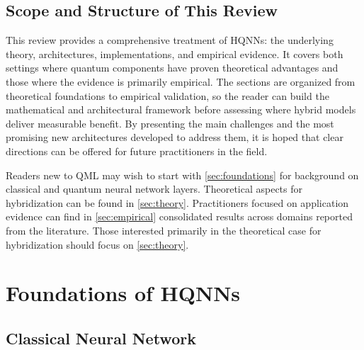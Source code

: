 \documentclass[aps,10pt,groupedaddress,prx,superscriptaddress,twocolumn,balancelastpage, tightenlines]{revtex4-2}
\theoremstyle{plain}  %
\begin{document}
\subsection{Scope and Structure of This Review}
\label{subsec:scope}

This review provides a comprehensive treatment of \glspl{HQNN}: the underlying theory, architectures, implementations, and empirical evidence. It covers both settings where quantum components have proven theoretical advantages and those where the evidence is primarily empirical. The sections are organized from theoretical foundations to empirical validation, so the reader can build the mathematical and architectural framework before assessing where hybrid models deliver measurable benefit. By presenting the main challenges and the most promising new architectures developed to address them, it is hoped that clear directions can be offered for future practitioners in the field.

Readers new to \gls{QML} may wish to start with
\autoref{sec:foundations} for background on classical and quantum neural network layers. Theoretical aspects for hybridization can be found in \autoref{sec:theory}. Practitioners focused on application evidence can find in \autoref{sec:empirical} consolidated results across domains reported from the literature. Those interested primarily in the theoretical case for hybridization should focus on \autoref{sec:theory}.



\section{Foundations of HQNNs}
\label{sec:foundations}
    \subsection{Classical Neural Network}
\end{document}

